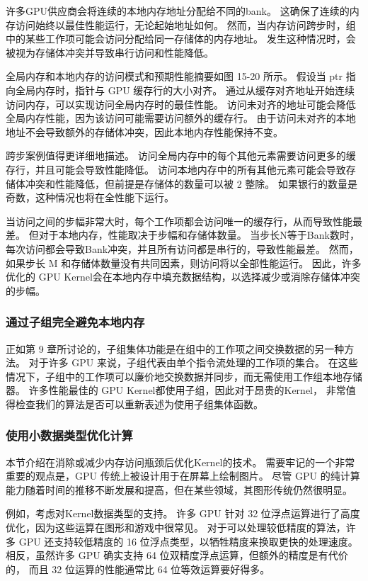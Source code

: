 许多GPU供应商会将连续的本地内存地址分配给不同的bank。 这确保了连续的内存访问始终以最佳性能运行，无论起始地址如何。 
然而，当内存访问跨步时，组中的某些工作项可能会访问分配给同一存储体的内存地址。 
发生这种情况时，会被视为存储体冲突并导致串行访问和性能降低。

全局内存和本地内存的访问模式和预期性能摘要如图 15-20 所示。 
假设当 ptr 指向全局内存时，指针与 GPU 缓存行的大小对齐。 
通过从缓存对齐地址开始连续访问内存，可以实现访问全局内存时的最佳性能。 
访问未对齐的地址可能会降低全局内存性能，因为该访问可能需要访问额外的缓存行。 
由于访问未对齐的本地地址不会导致额外的存储体冲突，因此本地内存性能保持不变。

跨步案例值得更详细地描述。 访问全局内存中的每个其他元素需要访问更多的缓存行，并且可能会导致性能降低。 
访问本地内存中的所有其他元素可能会导致存储体冲突和性能降低，但前提是存储体的数量可以被 2 整除。 
如果银行的数量是奇数，这种情况也将在全性能下运行。

当访问之间的步幅非常大时，每个工作项都会访问唯一的缓存行，从而导致性能最差。 
但对于本地内存，性能取决于步幅和存储体数量。 
当步长N等于Bank数时，每次访问都会导致Bank冲突，并且所有访问都是串行的，导致性能最差。 
然而，如果步长 M 和存储体数量没有共同因素，则访问将以全部性能运行。 
因此，许多优化的 GPU Kernel会在本地内存中填充数据结构，以选择减少或消除存储体冲突的步幅。

\subsubsection{通过子组完全避免本地内存}
正如第 9 章所讨论的，子组集体功能是在组中的工作项之间交换数据的另一种方法。 
对于许多 GPU 来说，子组代表由单个指令流处理的工作项的集合。 
在这些情况下，子组中的工作项可以廉价地交换数据并同步，而无需使用工作组本地存储器。 
许多性能最佳的 GPU Kernel都使用子组，因此对于昂贵的Kernel，
非常值得检查我们的算法是否可以重新表述为使用子组集体函数。

\subsubsection{使用小数据类型优化计算}
本节介绍在消除或减少内存访问瓶颈后优化Kernel的技术。 
需要牢记的一个非常重要的观点是，GPU 传统上被设计用于在屏幕上绘制图片。 
尽管 GPU 的纯计算能力随着时间的推移不断发展和提高，但在某些领域，其图形传统仍然很明显。

例如，考虑对Kernel数据类型的支持。 许多 GPU 针对 32 位浮点运算进行了高度优化，因为这些运算在图形和游戏中很常见。 
对于可以处理较低精度的算法，许多 GPU 还支持较低精度的 16 位浮点类型，以牺牲精度来换取更快的处理速度。 
相反，虽然许多 GPU 确实支持 64 位双精度浮点运算，但额外的精度是有代价的，
而且 32 位运算的性能通常比 64 位等效运算要好得多。


